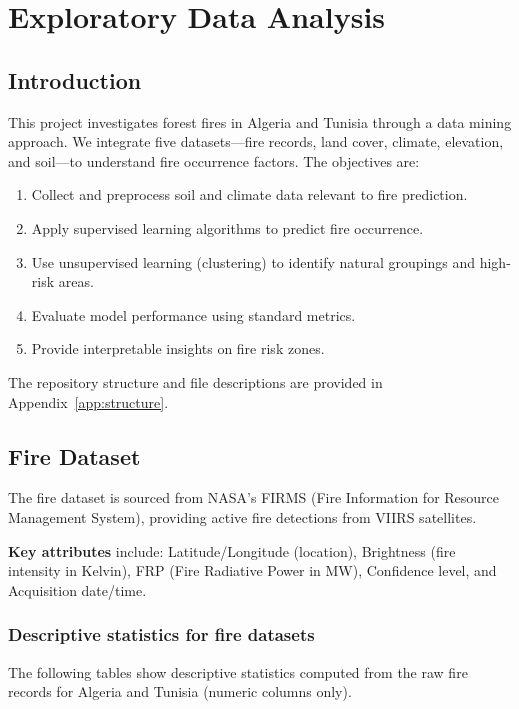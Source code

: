 \chapter{Exploratory Data Analysis}

\section{Introduction}
This project investigates forest fires in Algeria and Tunisia through a data mining approach. We integrate five datasets---fire records, land cover, climate, elevation, and soil---to understand fire occurrence factors. The objectives are:
\begin{enumerate}
    \item Collect and preprocess soil and climate data relevant to fire prediction.
    \item Apply supervised learning algorithms to predict fire occurrence.
    \item Use unsupervised learning (clustering) to identify natural groupings and high-risk areas.
    \item Evaluate model performance using standard metrics.
    \item Provide interpretable insights on fire risk zones.
\end{enumerate}

The repository structure and file descriptions are provided in Appendix~\ref{app:structure}.

\section{Fire Dataset}
The fire dataset is sourced from NASA's FIRMS (Fire Information for Resource Management System), providing active fire detections from VIIRS satellites.

\textbf{Key attributes} include: Latitude/Longitude (location), Brightness (fire intensity in Kelvin), FRP (Fire Radiative Power in MW), Confidence level, and Acquisition date/time.

\subsection*{Descriptive statistics for fire datasets}

The following tables show descriptive statistics computed from the raw fire records for Algeria and Tunisia (numeric columns only).

